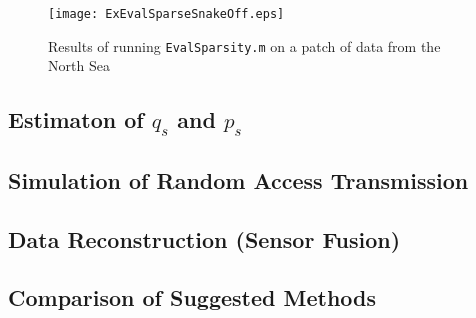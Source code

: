 \documentclass[Main]{subfiles}
\begin{document}
		\begin{figure}[H]
			\centering 
			\texttt{[image: ExEvalSparseSnakeOff.eps]}
			\caption{Results of running \texttt{EvalSparsity.m} on a patch of data from the North Sea}
			\label{fig:ExEvalSparseSnakeOff}
		\end{figure}



	

	\subsection{Estimaton of $q_s$ and $p_s$} %
	\label{sub:estimaton_of_q_s_and_p_s_}
	

	\subsection{Simulation of Random Access Transmission} %
	\label{sub:simulation_of_random_access_transmission}



	

	\subsection{Data Reconstruction (Sensor Fusion)} %
	\label{sub:data_reconstruction}
	

	
	\subsection{Comparison of Suggested Methods} %
	\label{sub:comparison_of_suggested_methods}

	

\end{document}
